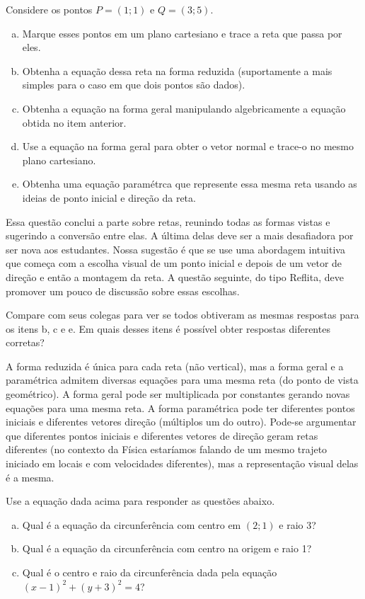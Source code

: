 \documentclass[main_estudante.tex]{subfiles}
\begin{document}
\begin{questao}
Considere os pontos $P=(1;1)$ e $Q=(3;5)$.
\begin{enumerate}[a)]
\item Marque esses pontos em um plano cartesiano e trace a reta que passa por eles.
\item Obtenha a equação dessa reta na forma reduzida (suportamente a mais simples para o caso em que dois pontos são dados).
\item Obtenha a equação na forma geral manipulando algebricamente a equação obtida no item anterior.
\item Use a equação na forma geral para obter o vetor normal e trace-o no mesmo plano cartesiano.
\item Obtenha uma equação paramétrca que represente essa mesma reta usando as ideias de ponto inicial e direção da reta.
\end{enumerate} 
\end{questao}

Essa questão conclui a parte sobre retas, reunindo todas as formas vistas e sugerindo a conversão entre elas. A última delas deve ser a mais desafiadora por ser nova aos estudantes. Nossa sugestão é que se use uma abordagem intuitiva que começa com a escolha visual de um ponto inicial e depois de um vetor de direção e então a montagem da reta. A questão seguinte, do tipo Reflita, deve promover um pouco de discussão sobre essas escolhas.

\begin{reflita}
Compare com seus colegas para ver se todos obtiveram as mesmas respostas para os itens b, c e e. Em quais desses itens é possível obter respostas diferentes corretas? 
\end{reflita}

A forma reduzida é única para cada reta (não vertical), mas a forma geral e a paramétrica admitem diversas equações para uma mesma reta (do ponto de vista geométrico). A forma geral pode ser multiplicada por constantes gerando novas equações para uma mesma reta. A forma paramétrica pode ter diferentes pontos iniciais e diferentes vetores direção (múltiplos um do outro). Pode-se argumentar que diferentes pontos iniciais e diferentes vetores de direção geram retas diferentes (no contexto da Física estaríamos falando de um mesmo trajeto iniciado em locais e com velocidades diferentes), mas a representação visual delas é a mesma.

\begin{questao}
Use a equação dada acima para responder as questões abaixo.
\begin{enumerate}[a)]
\item Qual é a equação da circunferência com centro em $(2;1)$ e raio 3? 
\item Qual é a equação da circunferência com centro na origem e raio 1?
\item Qual é o centro e raio da circunferência dada pela equação $(x-1)^2+(y+3)^2=4$?
\end{enumerate} 
\end{questao}
\end{document}
